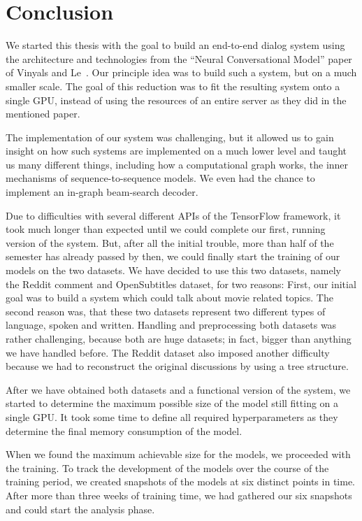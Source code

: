 \chapter{Conclusion}

We started this thesis with the goal to build an end-to-end dialog system using the architecture and technologies from the ``Neural Conversational Model'' paper of Vinyals and Le~\cite{Vinyals:2015}. Our principle idea was to build such a system, but on a much smaller scale. The goal of this reduction was to fit the resulting system onto a single GPU, instead of using the resources of an entire server as they did in the mentioned paper.

The implementation of our system was challenging, but it allowed us to gain insight on how such systems are implemented on a much lower level and taught us many different things, including how a computational graph works, the inner mechanisms of sequence-to-sequence models. We even had the chance to implement an in-graph beam-search decoder.

Due to difficulties with several different APIs of the TensorFlow framework, it took much longer than expected until we could complete our first, running version of the system. But, after all the initial trouble, more than half of the semester has already passed by then, we could finally start the training of our models on the two datasets. We have decided to use this two datasets, namely the Reddit comment and OpenSubtitles dataset, for two reasons: First, our initial goal was to build a system which could talk about movie related topics. The second reason was, that these two datasets represent two different types of language, spoken and written. Handling and preprocessing both datasets was rather challenging, because both are huge datasets; in fact, bigger than anything we have handled before. The Reddit dataset also imposed another difficulty because we had to reconstruct the original discussions by using a tree structure.

After we have obtained both datasets and a functional version of the system, we started to determine the maximum possible size of the model still fitting on a single GPU. It took some time to define all required hyperparameters as they determine the final memory consumption of the model.

When we found the maximum achievable size for the models, we proceeded with the training. To track the development of the models over the course of the training period, we created snapshots of the models at six distinct points in time. After more than three weeks of training time, we had gathered our six snapshots and could start the analysis phase.

